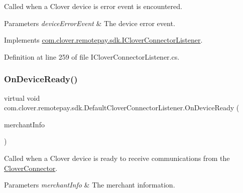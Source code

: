 Called when a Clover device is error event is encountered. 


\begin{DoxyParams}{Parameters}
{\em device\+Error\+Event} & The device error event.\\
\hline
\end{DoxyParams}


Implements \hyperlink{interfacecom_1_1clover_1_1remotepay_1_1sdk_1_1_i_clover_connector_listener_ab342b91dab98cd7ee976973315251291}{com.\+clover.\+remotepay.\+sdk.\+I\+Clover\+Connector\+Listener}.



Definition at line 259 of file I\+Clover\+Connector\+Listener.\+cs.

\mbox{\label{classcom_1_1clover_1_1remotepay_1_1sdk_1_1_default_clover_connector_listener_add16a6bfe009ef45650f9493425937b7}} 
\subsubsection{\texorpdfstring{On\+Device\+Ready()}{OnDeviceReady()}}
{\footnotesize\ttfamily virtual void com.\+clover.\+remotepay.\+sdk.\+Default\+Clover\+Connector\+Listener.\+On\+Device\+Ready (\begin{DoxyParamCaption}\item[{\hyperlink{classcom_1_1clover_1_1remotepay_1_1sdk_1_1_merchant_info}{Merchant\+Info}}]{merchant\+Info }\end{DoxyParamCaption})\hspace{0.3cm}{\ttfamily [virtual]}}



Called when a Clover device is ready to receive communications from the \hyperlink{classcom_1_1clover_1_1remotepay_1_1sdk_1_1_clover_connector}{Clover\+Connector}. 


\begin{DoxyParams}{Parameters}
{\em merchant\+Info} & The merchant information.\\
\hline
\end{DoxyParams}


